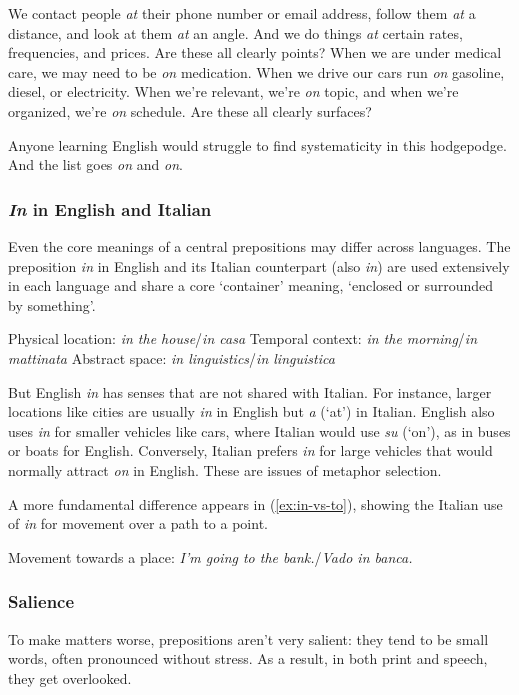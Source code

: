We contact people \emph{at} their phone number or email address, follow them \emph{at} a
distance, and look at them \emph{at} an angle. And we do things \emph{at} certain rates, frequencies, and prices. Are these all clearly points? When we are under medical
care, we may need to be \emph{on} medication. When we drive our cars run \emph{on} gasoline, diesel, or electricity. When we're relevant, we're \emph{on} topic, and when we're
organized, we're \emph{on} schedule. Are these all clearly surfaces? 

Anyone learning English would struggle to find systematicity in this hodgepodge. And the list goes \emph{on} and \emph{on}.

\subsubsection*{\textit{In} in English and Italian}

Even the core meanings of a central prepositions may differ across languages.
The preposition \textit{in} in English and its Italian counterpart (also \textit{in}) are used extensively in each language and share a core `container' meaning, `enclosed or
surrounded by something'.

\ea \label{ex:in-containment}
    \ea Physical location: \textit{in the house}/\textit{in casa}
    \ex Temporal context: \textit{in the morning}/\textit{in mattinata}
    \ex Abstract space: \textit{in linguistics}/\textit{in linguistica}
    \z
\z

But English \textit{in} has senses that are not shared with Italian. For instance, larger
locations like cities are usually \textit{in} in English but \textit{a} (`at') in Italian. English also
uses \textit{in} for smaller vehicles like cars, where Italian would use \textit{su} (`on'), as in buses
or boats for English. Conversely, Italian prefers \textit{in} for large vehicles that would
normally attract \textit{on} in English. These are issues of metaphor selection.

A more fundamental difference appears in (\ref{ex:in-vs-to}), showing the Italian use of \textit{in}
for movement over a path to a point.

\ea Movement towards a place: \textit{I'm going to the bank.}/\textit{Vado in banca.}\label{ex:in-vs-to}
\z

\subsubsection*{Salience}
To make matters worse, prepositions aren't very salient: they tend to be small words, often pronounced without stress. As a result, in both print and speech,
they get overlooked.

